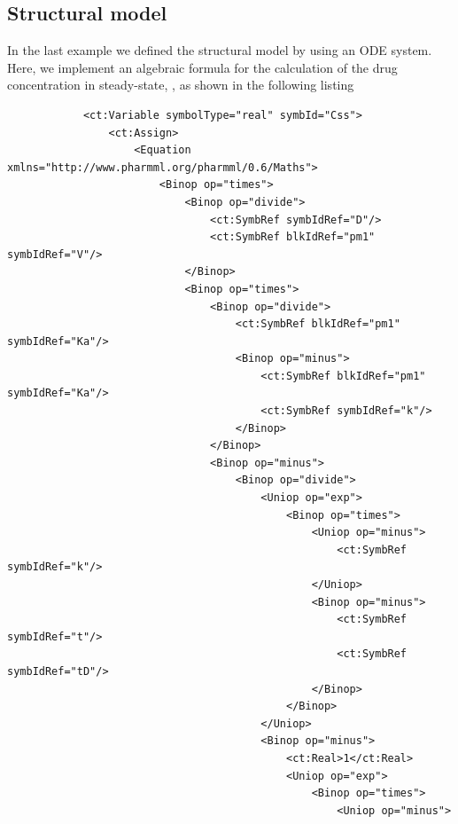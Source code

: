 \subsection{Structural model}
In the last example we defined the structural model by using an ODE system. 
Here, we implement an algebraic formula for the calculation of the drug
concentration in steady-state, , as shown in the following listing
\lstset{language=XML}
\begin{lstlisting}
            <ct:Variable symbolType="real" symbId="Css">
                <ct:Assign>
                    <Equation xmlns="http://www.pharmml.org/pharmml/0.6/Maths">
                        <Binop op="times">
                            <Binop op="divide">
                                <ct:SymbRef symbIdRef="D"/>
                                <ct:SymbRef blkIdRef="pm1" symbIdRef="V"/>
                            </Binop>
                            <Binop op="times">
                                <Binop op="divide">
                                    <ct:SymbRef blkIdRef="pm1" symbIdRef="Ka"/>
                                    <Binop op="minus">
                                        <ct:SymbRef blkIdRef="pm1" symbIdRef="Ka"/>
                                        <ct:SymbRef symbIdRef="k"/>
                                    </Binop>
                                </Binop>
                                <Binop op="minus">
                                    <Binop op="divide">
                                        <Uniop op="exp">
                                            <Binop op="times">
                                                <Uniop op="minus">
                                                    <ct:SymbRef symbIdRef="k"/>
                                                </Uniop>
                                                <Binop op="minus">
                                                    <ct:SymbRef symbIdRef="t"/>
                                                    <ct:SymbRef symbIdRef="tD"/>                                                    
                                                </Binop>
                                            </Binop>
                                        </Uniop>
                                        <Binop op="minus">
                                            <ct:Real>1</ct:Real>
                                            <Uniop op="exp">
                                                <Binop op="times">
                                                    <Uniop op="minus">

\end{lstlisting}
